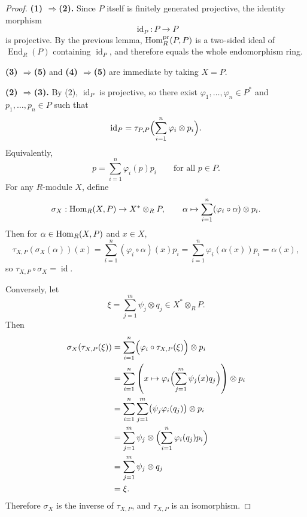 \begin{proof}
    \textbf{(1) $\Longrightarrow$(2).}
    Since $P$ itself is finitely generated projective, the identity morphism
    \[
        \operatorname{id}_P:P\to P
    \]
    is projective. By the previous lemma, $\mathrm{Hom}_R^{\operatorname{pr}}(P,P)$ is a two-sided ideal
    of $\operatorname{End}_R(P)$ containing $\operatorname{id}_P$, and therefore equals the whole
    endomorphism ring.

    \textbf{(3) $\Longrightarrow$(5)} and \textbf{(4) $\Longrightarrow$(5)} are immediate by
    taking $X=P$.

    \textbf{(2) $\Longrightarrow$(3).}
    By (2), $\operatorname{id}_P$ is projective, so there exist $\varphi_1,\dots,\varphi_n\in P^*$ and $p_1,\dots,p_n\in P$ such that
    \[
        \operatorname{id}_P=\tau_{P,P}\Bigl(\sum_{i=1}^n \varphi_i\otimes p_i\Bigr).
    \]
    Equivalently,
    \[
        p=\sum_{i=1}^n \varphi_i(p)p_i
        \qquad \text{for all } p\in P.
    \]
    For any $R$-module $X$, define
    \[
        \sigma_X:\mathrm{Hom}_R(X,P)\to X^*\otimes_R P,\qquad
        \alpha\mapsto \sum_{i=1}^n (\varphi_i\circ \alpha)\otimes p_i.
    \]
    Then for $\alpha\in \mathrm{Hom}_R(X,P)$ and $x\in X$,
    \[
        \tau_{X,P}(\sigma_X(\alpha))(x)
        =
        \sum_{i=1}^n (\varphi_i\circ \alpha)(x)p_i
        =
        \sum_{i=1}^n \varphi_i(\alpha(x))p_i
        =
        \alpha(x),
    \]
    so $\tau_{X,P}\circ \sigma_X=\operatorname{id}$.

    Conversely, let
    \[
        \xi=\sum_{j=1}^m \psi_j\otimes q_j\in X^*\otimes_R P.
    \]
    Then
    \begin{align*}
        \sigma_X(\tau_{X,P}(\xi))
         & =\sum_{i=1}^n \Bigl(\varphi_i\circ \tau_{X,P}(\xi)\Bigr)\otimes p_i                           \\
         & =\sum_{i=1}^n \left(x\mapsto \varphi_i\Bigl(\sum_{j=1}^m \psi_j(x)q_j\Bigr)\right)\otimes p_i \\
         & =\sum_{i=1}^n \sum_{j=1}^m \bigl(\psi_j \varphi_i(q_j)\bigr)\otimes p_i                       \\
         & =\sum_{j=1}^m \psi_j\otimes \Bigl(\sum_{i=1}^n \varphi_i(q_j)p_i\Bigr)                        \\
         & =\sum_{j=1}^m \psi_j\otimes q_j                                                               \\
         & =\xi.
    \end{align*}
    Therefore $\sigma_X$ is the inverse of $\tau_{X,P}$, and $\tau_{X,P}$ is an isomorphism.


\end{proof}
